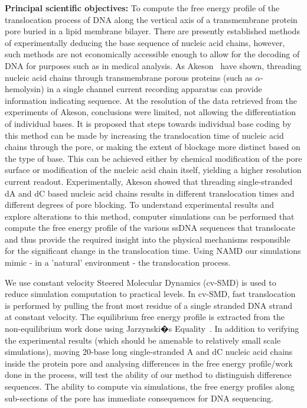 \documentclass[a4paper,10pt]{article}
\begin{document}
{\bf Principal scientific objectives:} To compute the free
energy profile of the translocation process of DNA along the vertical axis of
a transmembrane protein pore buried in a lipid membrane bilayer.  There are
presently established methods of experimentally deducing the base sequence of
nucleic acid chains, however, such methods are not economically accessible
enough to allow for the decoding of DNA for purposes such as in medical
analysis. As Akeson~\cite{akeson} have shown, threading nucleic acid chains through
transmembrane porous proteins (such as $\alpha$-hemolysin) in a single channel
current recording apparatus can provide information indicating sequence. At
the resolution of the data retrieved from the experiments of Akeson,
conclusions were limited, not allowing the differentiation of individual
bases. It is proposed that steps towards individual base coding by this method
can be made by increasing the translocation time of nucleic acid chains
through the pore, or making the extent of blockage more distinct based on the
type of base. This can be achieved either by chemical modification of the pore
surface or modification of the nucleic acid chain itself, yielding a higher
resolution current readout. Experimentally, Akeson showed that threading
single-stranded dA and dC based nucleic acid chains results in different
translocation times and different degrees of pore blocking. To understand
experimental results and explore alterations to this method, computer
simulations can be performed that compute the free energy profile of the
various ssDNA sequences that translocate and thus provide the required insight
into the physical mechanisms responsible for the significant change in the
translocation time. Using NAMD our simulations  mimic - in a 'natural'
environment - the translocation process. 

We use constant velocity Steered Molecular Dynamics (cv-SMD) is used to reduce simulation computation to practical levels. In cv-SMD, fast translocation is performed by pulling the front most residue of a single stranded DNA strand at constant velocity.  The equilibrium free energy profile is extracted from the non-equilibrium work done using Jarzynski�s Equality~\cite{jarz}.
In addition to verifying the experimental results (which should be amenable to
relatively small scale simulations), moving 20-base long single-stranded A and
dC nucleic acid chains inside the protein pore and analysing differences in
the free energy profile/work done in the process, will test the ability of our
method to distinguish difference sequences.
The ability to compute via simulations, the 
free energy profiles along sub-sections of the pore has immediate consequences for
DNA sequencing.
\end{document}
